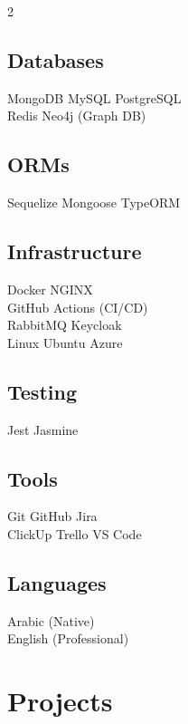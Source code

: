 \documentclass[]{deedy-resume-reversed}
\begin{document}
\begin{paracol}{2}
\subsection{Databases}
MongoDB \textbullet{} MySQL \textbullet{} PostgreSQL \\
Redis \textbullet{} Neo4j (Graph DB)
\sectionsep

\subsection{ORMs}
Sequelize \textbullet{} Mongoose \textbullet{} TypeORM
\sectionsep

\subsection{Infrastructure}
Docker \textbullet{} NGINX \\
GitHub Actions (CI/CD) \\
RabbitMQ \textbullet{} Keycloak \\
Linux Ubuntu \textbullet{} Azure
\sectionsep

\subsection{Testing}
Jest \textbullet{} Jasmine
\sectionsep

\subsection{Tools}
Git \textbullet{} GitHub \textbullet{} Jira \\
ClickUp \textbullet{} Trello \textbullet{} VS Code
\sectionsep

\subsection{Languages}
Arabic (Native) \\
English (Professional)
\sectionsep

\end{paracol}

\section{Projects}
\end{document}
